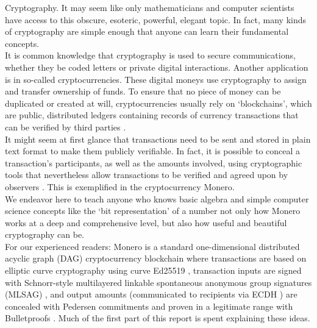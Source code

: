 

Cryptography. It may seem like only mathematicians and computer scientists have access to this obscure, esoteric, powerful, elegant topic. In fact, many kinds of cryptography are simple enough that anyone can learn their fundamental concepts.
\\ \newline
It is common knowledge that cryptography is used to secure communications, whether they be coded letters or private digital interactions. Another application is in so-called cryptocurrencies. These digital moneys use cryptography to assign and transfer ownership of funds. To ensure that no piece of money can be duplicated or created at will, cryptocurrencies usually rely on `blockchains', which are public, distributed ledgers containing records of currency transactions that can be verified by third parties \cite{Nakamoto_bitcoin}.
\\ \newline
It might seem at first glance that transactions need to be sent and stored in plain text format to make them publicly verifiable. In fact, it is possible to conceal a transaction's participants, as well as the amounts involved, using cryptographic tools that nevertheless allow transactions to be verified and agreed upon by observers \cite{cryptoNoteWhitePaper}. This is exemplified in the cryptocurrency Monero.
\\ \newline
We endeavor here to teach anyone who knows basic algebra and simple computer science concepts like the `bit representation' of a number not only how Monero works at a deep and comprehensive level, but also how useful and beautiful cryptography can be.
\\ \newline
For our experienced readers: Monero is a standard one-dimensional distributed acyclic graph (DAG) cryptocurrency blockchain \cite{Nakamoto_bitcoin} where transactions are based on elliptic curve cryptography using curve Ed25519 \cite{Bernstein2008}, transaction inputs are signed with Schnorr-style multilayered linkable spontaneous anonymous group signatures (MLSAG) \cite{MRL-0005-ringct}, and output amounts (communicated to recipients via ECDH \cite{Diffie-Hellman}) are concealed with Pedersen commitments \cite{maxwell-ct} and proven in a legitimate range with Bulletproofs \cite{Bulletproofs_paper}. Much of the first part of this report is spent explaining these ideas.